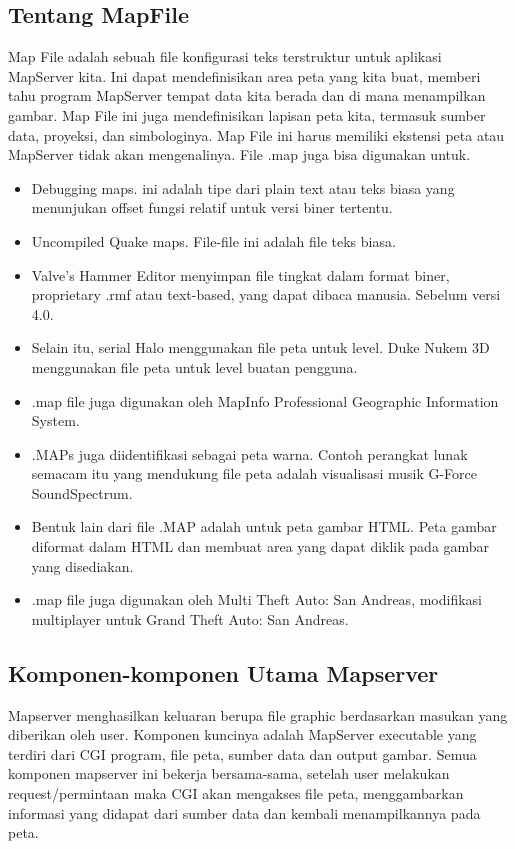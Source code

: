 \subsection{Tentang MapFile}
Map File adalah sebuah file konfigurasi teks terstruktur untuk aplikasi MapServer kita. Ini dapat mendefinisikan area peta yang kita buat, 
memberi tahu program MapServer tempat data kita berada dan di mana menampilkan gambar. 
Map File ini juga mendefinisikan lapisan peta kita, termasuk sumber data, proyeksi, dan simbologinya. 
Map File ini harus memiliki ekstensi peta atau MapServer tidak akan mengenalinya.
File .map juga bisa digunakan untuk.

\begin{itemize}
	\item Debugging maps. ini adalah tipe dari plain text atau teks biasa yang menunjukan offset fungsi relatif untuk versi biner tertentu.
	\item Uncompiled Quake maps. File-file ini adalah file teks biasa.
	\item Valve's Hammer Editor menyimpan file tingkat dalam format biner, proprietary .rmf atau text-based, yang dapat dibaca manusia. Sebelum versi 4.0.
	\item Selain itu, serial Halo menggunakan file peta untuk level. Duke Nukem 3D menggunakan file peta untuk level buatan pengguna.
	\item .map file juga digunakan oleh MapInfo Professional Geographic Information System.
	\item .MAPs juga diidentifikasi sebagai peta warna. Contoh perangkat lunak semacam itu yang mendukung file peta adalah visualisasi musik G-Force SoundSpectrum.
	\item Bentuk lain dari file .MAP adalah untuk peta gambar HTML. Peta gambar diformat dalam HTML dan membuat area yang dapat diklik pada gambar yang disediakan.
	\item .map file juga digunakan oleh Multi Theft Auto: San Andreas, modifikasi multiplayer untuk Grand Theft Auto: San Andreas.
\end{itemize}

\subsection{Komponen-komponen Utama Mapserver}
Mapserver menghasilkan keluaran berupa file graphic berdasarkan masukan yang diberikan oleh user. Komponen kuncinya adalah MapServer executable yang terdiri dari CGI program, file peta, sumber data dan output gambar. Semua komponen mapserver ini bekerja bersama-sama, setelah user melakukan request/permintaan maka CGI akan mengakses file peta, menggambarkan informasi yang didapat dari sumber data dan kembali menampilkannya pada peta.

